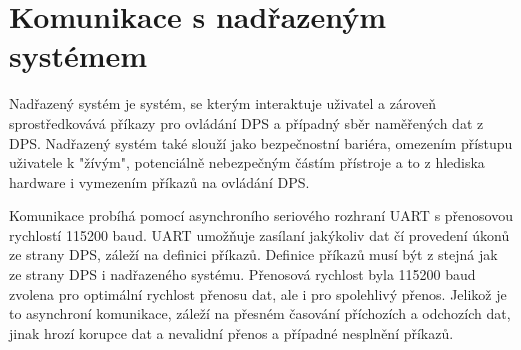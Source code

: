 \section{Komunikace s nadřazeným systémem}
Nadřazený systém je systém, se kterým interaktuje uživatel a zároveň sprostředkovává příkazy pro ovládání DPS a případný sběr naměřených dat z DPS.
Nadřazený systém také slouží jako bezpečnostní bariéra, omezením přístupu uživatele k "žívým", potenciálně nebezpečným částím přístroje a to z hlediska hardware i vymezením příkazů na ovládání DPS.
\par
Komunikace probíhá pomocí asynchroního seriového rozhraní UART s přenosovou rychlostí 115200 baud.
UART umožňuje zasílaní jakýkoliv dat čí provedení úkonů ze strany DPS, záleží na definici příkazů. Definice příkazů musí být z stejná jak ze strany DPS i nadřazeného systému.
Přenosová rychlost byla 115200 baud zvolena pro optimální rychlost přenosu dat, ale i pro spolehlivý přenos.
Jelikož je to asynchroní komunikace, záleží na přesném časování příchozích a odchozích dat,
jinak hrozí korupce dat a nevalidní přenos a případné nesplnění příkazů.